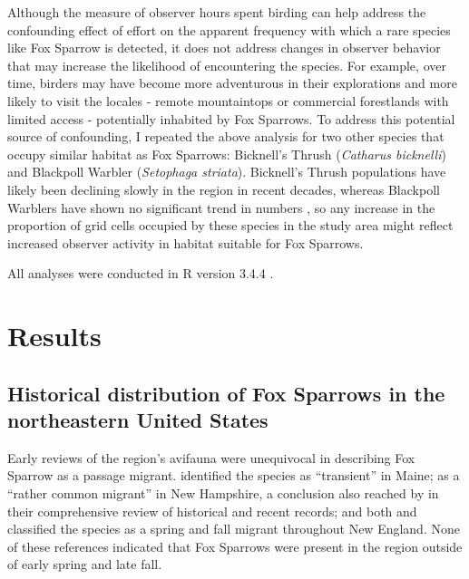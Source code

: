\documentclass[fleqn,10pt,lineno]{wlpeerj} %
\begin{document}
Although the measure of observer hours spent birding can help address the confounding effect of effort on the apparent frequency with which a rare species like Fox Sparrow is detected, it does not address changes in observer behavior that may increase the likelihood of encountering the species. For example, over time, birders may have become more adventurous in their explorations and more likely to visit the locales - remote mountaintops or commercial forestlands with limited access - potentially inhabited by Fox Sparrows. To address this potential source of confounding, I repeated the above analysis for two other species that occupy similar habitat as Fox Sparrows: Bicknell’s Thrush (\textit{Catharus bicknelli}) and Blackpoll Warbler (\textit{Setophaga striata}). Bicknell’s Thrush populations have likely been declining slowly in the region \citep{Lambert2008-jj,King2008-qx} in recent decades, whereas Blackpoll Warblers have shown no significant trend in numbers \citep{King2008-qx}, so any increase in the proportion of grid cells occupied by these species in the study area might reflect increased observer activity in habitat suitable for Fox Sparrows. 

All analyses were conducted in R version 3.4.4 \citep{R_Core_Team2018-cc}. 

\section*{Results}
\subsection*{Historical distribution of Fox Sparrows in the northeastern United States}
Early reviews of the region’s avifauna were unequivocal in describing Fox Sparrow as a passage migrant. \cite{Palmer1949-ig} identified the species as “transient” in Maine; \cite{Allen1903-xq} as a “rather common migrant” in New Hampshire, a conclusion also reached by \cite{Keith2013-gt} in their comprehensive review of historical and recent records; and both \cite{Samuels1875-jo} and \cite{Forbush1929-pq} classified the species as a spring and fall migrant throughout New England. None of these references indicated that Fox Sparrows were present in the region outside of early spring and late fall. 
\end{document}
